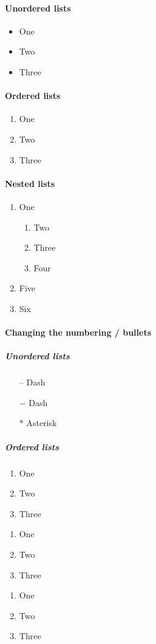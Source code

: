 \documentclass{article}
\begin{document}
  
  \paragraph{Unordered lists}
  \begin{itemize}
    \item One
    \item Two
    \item Three
  \end{itemize}
  
  \paragraph{Ordered lists}
  \begin{enumerate}
    \item One
    \item Two
    \item Three
  \end{enumerate}
  
  \paragraph{Nested lists}
  \begin{enumerate}
    \item One
    \begin{enumerate}
      \item Two
      \item Three
      \item Four
    \end{enumerate}
    \item Five
    \item Six
  \end{enumerate}
  
  \paragraph{Changing the numbering / bullets}
  
  \subparagraph{Unordered lists}
  \begin{itemize}
    \item[--] Dash
    \item[$-$] Dash
    \item[$\ast$] Asterisk
  \end{itemize}
  
  \subparagraph{Ordered lists}
  \begin{enumerate}[label=\roman*]
    \item One
    \item Two
    \item Three
  \end{enumerate}
  
  \begin{enumerate}[label=(\arabic*)]
    \item One
    \item Two
    \item Three
  \end{enumerate}
  
  \begin{enumerate}[label=(\alph*)]
    \item One
    \item Two
    \item Three
  \end{enumerate}
  
\end{document}
